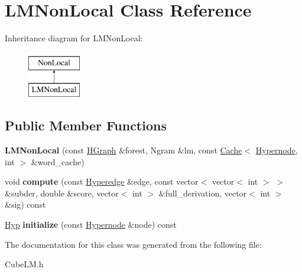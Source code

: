 \hypertarget{class_l_m_non_local}{
\section{LMNonLocal Class Reference}
\label{class_l_m_non_local}
}
Inheritance diagram for LMNonLocal:\begin{figure}[H]
\begin{center}
\leavevmode
\includegraphics[height=2cm]{class_l_m_non_local}
\end{center}
\end{figure}
\subsection*{Public Member Functions}
\begin{DoxyCompactItemize}
\item 
\hypertarget{class_l_m_non_local_a7a6000f6118f1c8df727fac29c849b58}{
{\bfseries LMNonLocal} (const \hyperlink{class_scarab_1_1_h_g_1_1_h_graph}{HGraph} \&forest, Ngram \&lm, const \hyperlink{class_cache}{Cache}$<$ \hyperlink{class_scarab_1_1_h_g_1_1_hypernode}{Hypernode}, int $>$ \&word\_\-cache)}
\label{class_l_m_non_local_a7a6000f6118f1c8df727fac29c849b58}

\item 
\hypertarget{class_l_m_non_local_a2d14ca694dc6d49ce6e2b80622aafd51}{
void {\bfseries compute} (const \hyperlink{class_scarab_1_1_h_g_1_1_hyperedge}{Hyperedge} \&edge, const vector$<$ vector$<$ int $>$ $>$ \&subder, double \&score, vector$<$ int $>$ \&full\_\-derivation, vector$<$ int $>$ \&sig) const }
\label{class_l_m_non_local_a2d14ca694dc6d49ce6e2b80622aafd51}

\item 
\hypertarget{class_l_m_non_local_a93334d873bfe91d5357cbec933ec3ae9}{
\hyperlink{struct_hyp}{Hyp} {\bfseries initialize} (const \hyperlink{class_scarab_1_1_h_g_1_1_hypernode}{Hypernode} \&node) const }
\label{class_l_m_non_local_a93334d873bfe91d5357cbec933ec3ae9}

\end{DoxyCompactItemize}


The documentation for this class was generated from the following file:\begin{DoxyCompactItemize}
\item 
CubeLM.h\end{DoxyCompactItemize}
